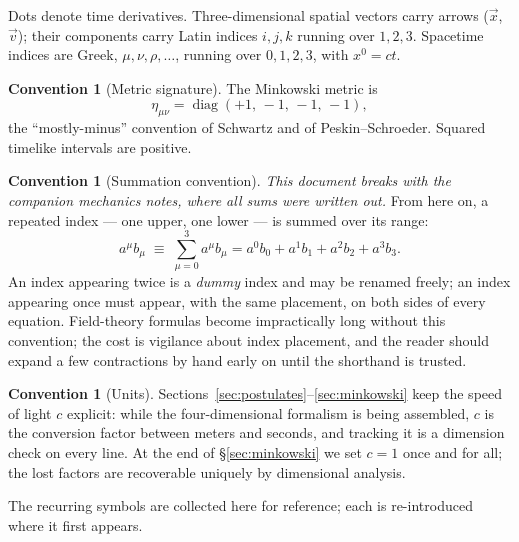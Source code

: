\documentclass[11pt]{article}
\theoremstyle{plain}
\theoremstyle{definition}
\newtheorem{convention}[theorem]{Convention}
\theoremstyle{remark}
\newcommand{\vx}{\vec{x}}
\newcommand{\vv}{\vec{v}}
\begin{document}
Dots denote time derivatives. Three-dimensional spatial vectors carry
arrows ($\vx$, $\vv$); their components carry Latin indices $i,j,k$
running over $1,2,3$. Spacetime indices are Greek, $\mu,\nu,\rho,\dots$,
running over $0,1,2,3$, with $x^0 = ct$.

\begin{convention}[Metric signature]\label{conv:signature}
The Minkowski metric is
\begin{equation}
  \eta_{\mu\nu} = \operatorname{diag}(+1,\,-1,\,-1,\,-1),
\end{equation}
the ``mostly-minus'' convention of Schwartz and of Peskin--Schroeder.
Squared timelike intervals are positive.
\end{convention}

\begin{convention}[Summation convention]\label{conv:summation}
\emph{This document breaks with the companion mechanics notes, where all
sums were written out.} From here on, a repeated index --- one upper, one
lower --- is summed over its range:
\begin{equation}
  a^\mu b_\mu \;\equiv\; \sum_{\mu=0}^{3} a^\mu b_\mu
  = a^0 b_0 + a^1 b_1 + a^2 b_2 + a^3 b_3 .
\end{equation}
An index appearing twice is a \emph{dummy} index and may be renamed
freely; an index appearing once must appear, with the same placement, on
both sides of every equation. Field-theory formulas become impractically long without this
convention; the cost is vigilance about index placement, and the reader
should expand a few contractions by hand early on until the shorthand is
trusted.
\end{convention}

\begin{convention}[Units]\label{conv:units}
Sections~\ref{sec:postulates}--\ref{sec:minkowski} keep the speed of
light $c$ explicit: while the four-dimensional formalism is being
assembled, $c$ is the conversion factor between meters and seconds, and
tracking it is a dimension check on every line. At the end of
\S\ref{sec:minkowski} we set $c=1$ once and for all; the lost factors are
recoverable uniquely by dimensional analysis.
\end{convention}

\noindent
The recurring symbols are collected here for reference; each is
re-introduced where it first appears.
\end{document}
